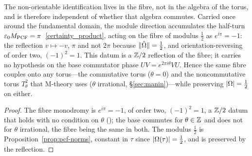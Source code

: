 \begin{proposition}\label{prop:mobius-torus}
The non-orientable identification lives in the fibre, not in the algebra of the torus, and is
therefore independent of whether that algebra commutes. Carried once around the fundamental
domain, the module direction accumulates the half-turn $\varepsilon_{0}M_{\mathrm{PCF}}=\pi$~\eqref{certainty_product},
acting on the fibre of modulus $\tfrac12$ as $e^{i\pi}=-1$: the reflection $v\mapsto -v$, $\pi$
and not $2\pi$ because $\|\hat{\Omega}\|=\tfrac12$, and orientation-reversing of order two,
$(-1)^2=1$. This datum is a $\mathbb{Z}/2$ reflection of the fibre; it carries no hypothesis on the
base commutator phase $UV=e^{2\pi i\theta}VU$. Hence the same fibre couples onto any torus---the
commutative torus ($\theta=0$) and the noncommutative torus $T^2_\theta$ that M-theory uses
($\theta$ irrational, \S\ref{sec:manin})---while preserving $|\Omega|=\tfrac12$ on either.

\end{proposition}
\begin{proof}
The fibre monodromy is $e^{i\pi}=-1$, of order two, $(-1)^2=1$, a $\mathbb{Z}/2$ datum that holds with
no condition on $\theta$ (); the base commutes for
$\theta\in\mathbb{Z}$ and does not for $\theta$ irrational, the fibre being the same in both. The
modulus $\tfrac12$ is Proposition~\ref{prop:pcf-norms}, constant in $\tau$ since
$|\Omega(\tau)|=\tfrac12$, and is preserved by the reflection.
\end{proof}

